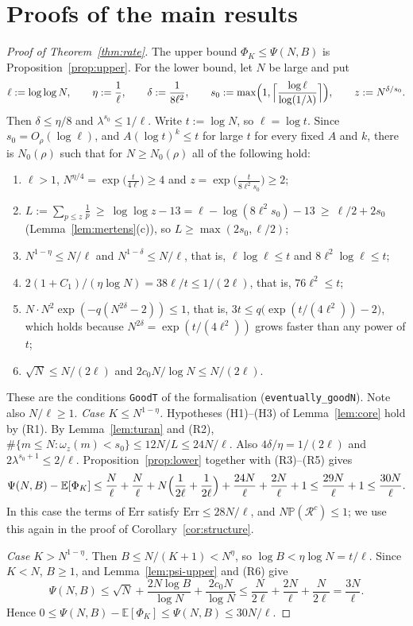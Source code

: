 \documentclass[11pt]{amsart}
\theoremstyle{definition}
\newcommand{\E}{\mathbb{E}}
\newcommand{\Prob}{\mathbb{P}}
\newcommand{\cR}{\mathcal{R}}
\begin{document}
\section{Proofs of the main results}\label{sec:proofs}

\begin{proof}[Proof of Theorem~\ref{thm:rate}]
The upper bound $\Phi_K\le\Psi(N,B)$ is Proposition~\ref{prop:upper}. For the lower bound, let $N$ be large and put
\[
\ell:=\log\log N,\qquad\eta:=\frac1\ell,\qquad\delta:=\frac1{8\ell^2},\qquad s_0:=\max\Bigl(1,\Bigl\lceil\frac{\log\ell}{\log(1/\lambda)}\Bigr\rceil\Bigr),\qquad z:=N^{\delta/s_0}.
\]
Then $\delta\le\eta/8$ and $\lambda^{s_0}\le 1/\ell$. Write $t:=\log N$, so $\ell=\log t$. Since $s_0=O_\rho(\log\ell)$, and $A(\log t)^k\le t$ for large $t$ for every fixed $A$ and $k$, there is $N_0(\rho)$ such that for $N\ge N_0(\rho)$ all of the following hold:
\begin{enumerate}[label=(R\arabic*)]
\item $\ell>1$, $N^{\eta/4}=\exp\bigl(\frac{t}{4\ell}\bigr)\ge4$ and $z=\exp\bigl(\frac{t}{8\ell^2s_0}\bigr)\ge2$;
\item $L:=\sum_{p\le z}\frac1p\ \ge\ \log\log z-13=\ell-\log(8\ell^2s_0)-13\ \ge\ \ell/2+2s_0$ (Lemma~\ref{lem:mertens}(c)), so $L\ge\max(2s_0,\ell/2)$;
\item $N^{1-\eta}\le N/\ell$ and $N^{1-\delta}\le N/\ell$, that is, $\ell\log\ell\le t$ and $8\ell^2\log\ell\le t$;
\item $2(1+C_1)/(\eta\log N)=38\ell/t\le1/(2\ell)$, that is, $76\ell^2\le t$;
\item $N\cdot N^2\exp(-q(N^{2\delta}-2))\le1$, that is, $3t\le q\bigl(\exp(t/(4\ell^2))-2\bigr)$, which holds because $N^{2\delta}=\exp(t/(4\ell^2))$ grows faster than any power of $t$;
\item $\sqrt N\le N/(2\ell)$ and $2c_0N/\log N\le N/(2\ell)$.
\end{enumerate}
These are the conditions \texttt{GoodT} of the formalisation (\texttt{eventually\_goodN}). Note also $N/\ell\ge1$.
\emph{Case $K\le N^{1-\eta}$.} Hypotheses (H1)--(H3) of Lemma~\ref{lem:core} hold by (R1). By Lemma~\ref{lem:turan} and (R2), $\#\{m\le N:\omega_z(m)<s_0\}\le12N/L\le24N/\ell$. Also $4\delta/\eta=1/(2\ell)$ and $2\lambda^{s_0+1}\le2/\ell$. Proposition~\ref{prop:lower} together with (R3)--(R5) gives
\[
\Psi(N,B)-\E[\Phi_K]\le\frac N\ell+\frac N\ell+N\Bigl(\frac1{2\ell}+\frac1{2\ell}\Bigr)+\frac{24N}\ell+\frac{2N}\ell+1\le\frac{29N}{\ell}+1\le\frac{30N}{\ell}.
\]
In this case the terms of $\mathrm{Err}$ satisfy $\mathrm{Err}\le 28N/\ell$, and $N\Prob(\cR^c)\le1$; we use this again in the proof of Corollary~\ref{cor:structure}.

\emph{Case $K>N^{1-\eta}$.} Then $B\le N/(K+1)<N^{\eta}$, so $\log B<\eta\log N=t/\ell$. Since $K<N$, $B\ge1$, and Lemma~\ref{lem:psi-upper} and (R6) give
\[
\Psi(N,B)\le\sqrt N+\frac{2N\log B}{\log N}+\frac{2c_0N}{\log N}\le\frac N{2\ell}+\frac{2N}\ell+\frac N{2\ell}=\frac{3N}\ell .
\]
Hence $0\le\Psi(N,B)-\E[\Phi_K]\le\Psi(N,B)\le 30N/\ell$.
\end{proof}
\end{document}
